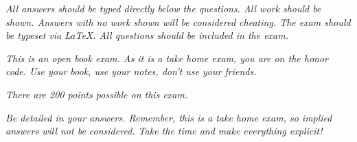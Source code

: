 \documentclass[letterpaper,10pt,onecolumn,titlepage]{article}
\begin{document}


\emph{All answers should be typed directly below the questions. All work should be shown.
  Answers with no work shown will be considered cheating. The exam should be typeset via
  \LaTeX. All questions should be included in the exam.}

\emph{This is an open book exam. As it is a take home exam, you are on the honor code.
  Use your book, use your notes, don't use your friends.}

\emph{There are 200 points possible on this exam.}

\emph{Be detailed in your answers. Remember, this is a take home exam, so implied answers
  will not be considered. Take the time and make everything explicit!}
\end{document}
